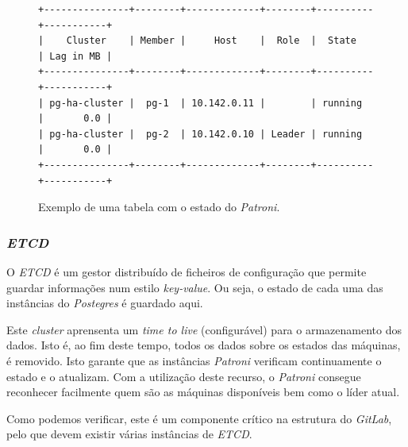 \documentclass[12pt,a4paper]{article}
\begin{document}
\begin{figure}[H]
\begin{verbatim}
+---------------+--------+-------------+--------+----------+-----------+
|    Cluster    | Member |     Host    |  Role  |  State   | Lag in MB |
+---------------+--------+-------------+--------+----------+-----------+
| pg-ha-cluster |  pg-1  | 10.142.0.11 |        | running  |       0.0 |
| pg-ha-cluster |  pg-2  | 10.142.0.10 | Leader | running  |       0.0 |
+---------------+--------+-------------+--------+----------+-----------+
\end{verbatim}
\caption{Exemplo de uma tabela com o estado do \emph{Patroni}.}
\label{fig:c}
\end{figure}



\subsubsection{\emph{ETCD}}

O \emph{ETCD} é um gestor distribuído de ficheiros de configuração que permite guardar informações num estilo \emph{key-value}. Ou seja, o estado de cada uma das instâncias do \emph{Postegres} é guardado aqui. 

Este \emph{cluster} aprensenta um \emph{time to live} (configurável) para o armazenamento dos dados. Isto é, ao fim deste tempo, todos os dados sobre os estados das máquinas, é removido. Isto garante que as instâncias \emph{Patroni} verificam continuamente o estado e o atualizam. Com a utilização deste recurso, o \emph{Patroni} consegue reconhecer facilmente quem são as máquinas disponíveis bem como o líder atual.

Como podemos verificar, este é um componente crítico na estrutura do \emph{GitLab}, pelo que devem existir várias instâncias de \emph{ETCD}.

\newpage
\end{document}
